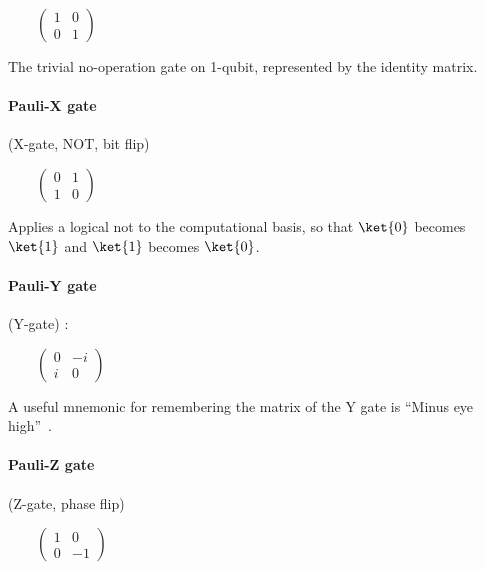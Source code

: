 \documentclass[article,pagebackref]{bespoke5}
\begin{document}
\begin{center}

%
$\qquad\left(\begin{array}{rr}1 & 0 \\ 0 & 1 \end{array}\right)$
\end{center}
The trivial no-operation gate on 1-qubit, represented by the identity matrix. 

\paragraph{Pauli-X gate} (X-gate, NOT, bit flip)
\begin{center}

%
$\qquad\left(\begin{array}{rr}0 & 1 \\ 1 & 0 \end{array}\right)$
\end{center}
Applies a logical not to the computational basis, so that $\ket{0}$ becomes $\ket{1}$ and $\ket{1}$ becomes $\ket{0}$. 



\paragraph{Pauli-Y gate} (Y-gate) :

\begin{center}

%
$\qquad\left(\begin{array}{rr} 0 & -i \\ i & 0 \end{array}\right)$
\end{center}
A useful mnemonic for remembering the matrix of the Y gate is ``Minus eye high''~\cite{???}.



\paragraph{Pauli-Z gate} (Z-gate, phase flip)

\begin{center}

%
$\qquad\left(\begin{array}{rr}1 & 0 \\ 0 & -1 \end{array}\right)$
\end{center}
\end{document}
